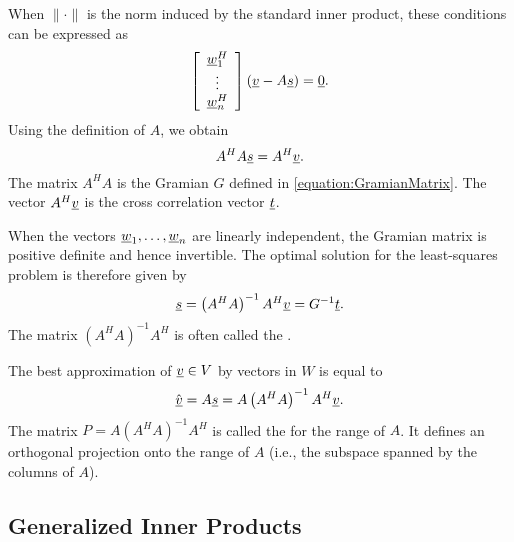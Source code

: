 When $\| \cdot \|$ is the norm induced by the standard inner product, these conditions can be expressed as
\begin{equation*}
\left[ \begin{array}{c} \underline{w}_1^H \\ \vdots \\ \underline{w}_n^H \end{array} \right] \left( \underline{v} - A \underline{s} \right) = \underline{0} .
\end{equation*}
Using the definition of $A$, we obtain
\begin{equation*}
A^H A \underline{s} = A^H \underline{v} .
\end{equation*}
The matrix $A^H A$ is the Gramian $G$ defined in \eqref{equation:GramianMatrix}.
The vector $A^H \underline{v}$ is the cross correlation vector $\underline{t}$.

When the vectors $\underline{w}_1, \ldots, \underline{w}_n$ are linearly independent, the Gramian matrix is positive definite and hence invertible.
The optimal solution for the least-squares problem is therefore given by
\begin{equation*}
\underline{s} = \left( A^H A \right)^{-1} A^H \underline{v} = G^{-1} \underline{t} .
\end{equation*}
The matrix $\left( A^H A \right)^{-1} A^H$ is often called the .

The best approximation of $\underline{v} \in V$ by vectors in $W$ is equal to
\begin{equation*}
\hat{\underline{v}} = A \underline{s} = A \left( A^H A \right)^{-1} A^H \underline{v} .
\end{equation*}
The matrix $P = A \left( A^H A \right)^{-1} A^H$ is called the  for the range of $A$.
It defines an orthogonal projection onto the range of $A$ (i.e., the subspace spanned by the columns of $A$).


\subsection{Generalized Inner Products}

